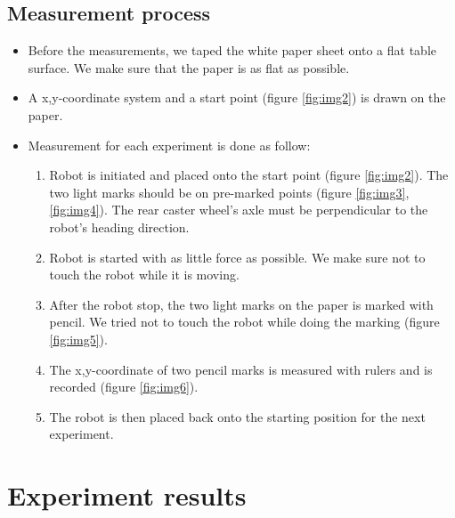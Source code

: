 \documentclass[paper=a4, fontsize=11pt]{scrartcl} %
\begin{document}
    \subsection{Measurement process}
    \begin{itemize}
        \item Before the measurements, we taped the white paper sheet onto a flat table surface. We make sure that the paper is as flat as possible.
        \item A x,y-coordinate system and a start point (figure \ref{fig:img2}) is drawn on the paper.
        \item Measurement for each experiment is done as follow:
        \begin{enumerate}
            \item Robot is initiated and placed onto the start point (figure \ref{fig:img2}). The two light marks should be on pre-marked points (figure \ref{fig:img3}, \ref{fig:img4}). The rear caster wheel's axle must be perpendicular to the robot's heading direction.
            \item Robot is started with as little force as possible. We make sure not to touch the robot while it is moving.
            \item After the robot stop, the two light marks on the paper is marked with pencil. We tried not to touch the robot while doing the marking (figure \ref{fig:img5}).
            \item The x,y-coordinate of two pencil marks is measured with rulers and is recorded (figure \ref{fig:img6}).
            \item The robot is then placed back onto the starting position for the next experiment.
        \end{enumerate}
    
    \end{itemize}

    \section{Experiment results}
\end{document}
